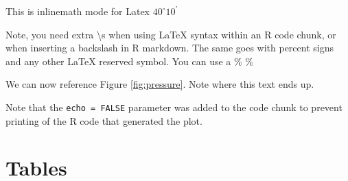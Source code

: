 \documentclass[12pt,]{article}
\begin{document}
This is inlinemath mode for Latex \(40^\circ 10^\prime\)

Note, you need extra \textbackslash{}s when using LaTeX syntax within an
R code chunk, or when inserting a backslash in R markdown. The same goes
with percent signs and any other LaTeX reserved symbol. You can use a \%
\(\%\)

\FloatBarrier

We can now reference Figure \ref{fig:pressure}. Note where this text
ends up.

Note that the \texttt{echo\ =\ FALSE} parameter was added to the code
chunk to prevent printing of the R code that generated the plot.

\section{Tables}\label{tables}

\begin{table}[ht]
\centering
\caption{This is where you write your caption} 
\label{tab:Table_example}
\end{table}
\end{document}
